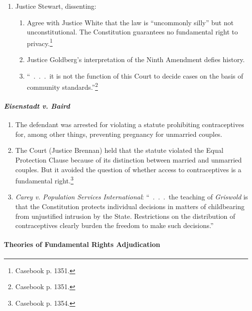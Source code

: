 \begin{enumerate}
\begin{enumerate}
        liberty and justice'' or the ``traditions and [collective] conscience 
        of our people.''\footnote{Casebook p. 1351.}
    \end{enumerate}
    \item Justice Stewart, dissenting:
    \begin{enumerate}
        \item Agree with Justice White that the law is ``uncommonly silly'' 
        but not unconstitutional. The Constitution guarantees no fundamental 
        right to privacy.\footnote{Casebook p. 1351.}
        \item Justice Goldberg's interpretation of the Ninth Amendment defies 
        history.
        \item ``~.~.~.~it is not the function of this Court to decide cases on 
        the basis of community standards.''\footnote{Casebook p. 1351.}
    \end{enumerate}
\end{enumerate}

\paragraph{\emph{Eisenstadt v. Baird}}
 
\begin{enumerate}
    \item The defendant was arrested for violating a statute prohibiting 
    contraceptives for, among other things, preventing pregnancy for unmarried 
    couples.
    \item The Court (Justice Brennan) held that the statute violated the Equal 
    Protection Clause because of its distinction between married and unmarried 
    couples. But it avoided the question of whether access to contraceptives 
    is a fundamental right.\footnote{Casebook p. 1354.}
    \item \emph{Carey v. Population Services International}: ``~.~.~.~the 
    teaching of \emph{Griswold} is that the Constitution protects individual 
    decisions in matters of childbearing from unjustified intrusion by the 
    State. Restrictions on the distribution of contraceptives clearly burden 
    the freedom to make such decisions.''
\end{enumerate}

\paragraph{Theories of Fundamental Rights Adjudication}

